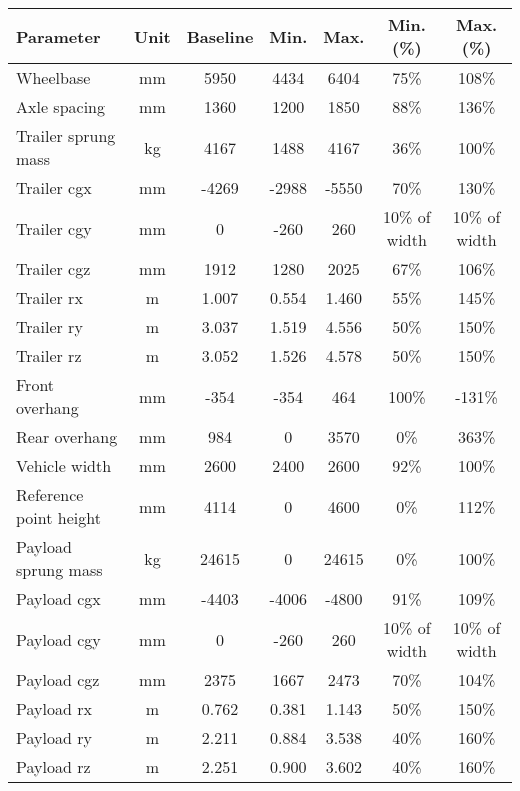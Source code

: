 \begin{table}[H]
	\centering\footnotesize
	\begin{threeparttable}

		\begin{tabulary}{\textwidth}{lcccccc}
			\toprule
			\textbf{Parameter} & \textbf{Unit} & \textbf{Baseline} & \textbf{Min.} & \textbf{Max.} & \textbf{Min. (\%)} & \textbf{Max. (\%)} \\

			\midrule
			Wheelbase & mm & 5950  & 4434  & 6404  & 75\%  & 108\% \\
			Axle spacing & mm    & 1360  & 1200  & 1850  & 88\%  & 136\% \\
			Trailer sprung mass & kg    & 4167  & 1488  & 4167  & 36\%  & 100\% \\
			Trailer \gls{cgx} & mm    & -4269  & -2988  & -5550  & 70\%  & 130\% \\
			Trailer \gls{cgy} & mm    & 0     & -260  & 260   & 10\% of width & 10\% of width \\
			Trailer \gls{cgz} & mm    & 1912  & 1280  & 2025  & 67\%  & 106\% \\
			Trailer \gls{rx} & m     & 1.007 & 0.554 & 1.460 & 55\%  & 145\% \\
			Trailer \gls{ry} & m     & 3.037 & 1.519 & 4.556 & 50\%  & 150\% \\
			Trailer \gls{rz} & m     & 3.052 & 1.526 & 4.578 & 50\%  & 150\% \\
			Front overhang & mm & -354  & -354  & 464   & 100\% & -131\% \\
			Rear overhang & mm & 984   & 0     & 3570  & 0\%   & 363\% \\
			Vehicle width & mm    & 2600  & 2400  & 2600  & 92\%  & 100\% \\
			Reference point height & mm    & 4114  & 0     & 4600  & 0\%   & 112\% \\
			Payload sprung mass & kg    & 24615 & 0     & 24615 & 0\%   & 100\% \\
			Payload \gls{cgx} & mm    & -4403  & -4006  & -4800  & 91\%  & 109\% \\
			Payload \gls{cgy} & mm    & 0     & -260  & 260   & 10\% of width & 10\% of width \\
			Payload \gls{cgz} & mm    & 2375  & 1667  & 2473  & 70\%  & 104\% \\
			Payload \gls{rx} & m     & 0.762 & 0.381 & 1.143 & 50\%  & 150\% \\
			Payload \gls{ry} & m     & 2.211 & 0.884 & 3.538 & 40\%  & 160\% \\
			Payload \gls{rz} & m     & 2.251 & 0.900 & 3.602 & 40\%  & 160\% \\


\end{tabulary}
\end{threeparttable}
\end{table}
